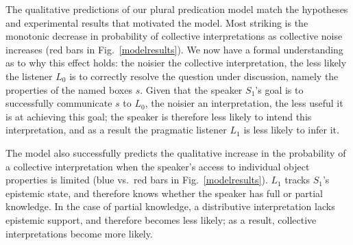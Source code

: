 \documentclass[preprint,12pt,authoryear,titlepage]{elsarticle}
\begin{document}


The qualitative predictions of our plural predication model match the hypotheses and experimental results that motivated the model. Most striking is the monotonic decrease in probability of collective interpretations as collective noise increases (red bars in  Fig.~\ref{modelresults}). We now have a formal understanding as to why this effect holds: the noisier the collective interpretation, the less likely the listener $L_{0}$ is to correctly resolve the question under discussion, namely the properties of the named boxes $s$. Given that the speaker $S_{1}$'s goal is to successfully communicate $s$ to $L_{0}$, the noisier an interpretation, the less useful it is at achieving this goal; the speaker is therefore less likely to intend this interpretation, and as a result the pragmatic listener $L_{1}$ is less likely to infer it.

The model also successfully predicts the qualitative increase in the probability of a collective interpretation when the speaker's  access to individual object properties is limited (blue vs.~red bars in  Fig.~\ref{modelresults}). %
$L_{1}$ tracks  $S_{1}$'s epistemic state, and therefore knows whether the speaker has full or partial knowledge. In the case of partial knowledge, a distributive interpretation lacks epistemic support, and therefore becomes less likely; as a result, collective interpretations become more likely.

\end{document}
